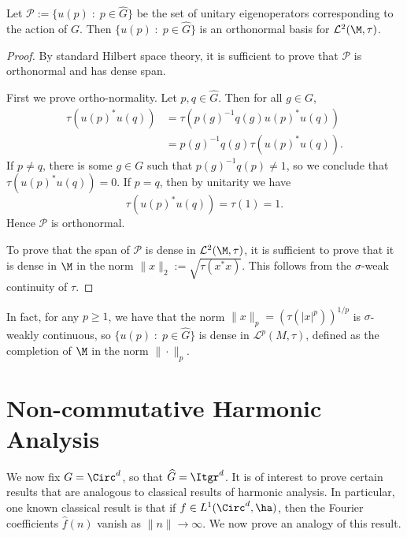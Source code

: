 \begin{proposition}
    Let $\mathcal{P} := \{u(p)\;:\;p \in \widehat{G}\}$ be the set of unitary eigenoperators
    corresponding to the action of $G$. Then $\{u(p)\;:\; p \in \widehat{G}\}$
    is an orthonormal basis for $\mathcal{L}^2(\M,\tau)$.
\end{proposition}
\begin{proof}
    By standard Hilbert space theory, it is sufficient to prove that $\mathcal{P}$
    is orthonormal and has dense span.
    
    First we prove ortho-normality. Let $p,q \in \widehat{G}$. Then for all $g \in G$,
    \begin{align}
        \tau(u(p)^*u(q)) &= \tau(p(g)^{-1}q(g)u(p)^*u(q))\\
        &= p(g)^{-1}q(g)\tau(u(p)^*u(q)).
    \end{align}
    If $p \neq q$, there is some $g \in G$ such that $p(g)^{-1}q(p) \neq 1$,
    so we conclude that $\tau(u(p)^*u(q)) = 0$.
    If $p = q$, then by unitarity we have
    \begin{equation}
        \tau(u(p)^*u(q)) = \tau(1) = 1.
    \end{equation}
    Hence $\mathcal{P}$ is orthonormal.
    
    To prove that the span of $\mathcal{P}$ is dense in $\mathcal{L}^2(\M,\tau)$,
    it is sufficient to prove that it is dense in $\M$ in the norm $\|x\|_2 := \sqrt{\tau(x^*x)}$.
    This follows from the $\sigma$-weak continuity of $\tau$.
\end{proof}

\begin{remark}
    In fact, for any $p \geq 1$, we have that the norm $\|x\|_p = (\tau(|x|^p))^{1/p}$
    is $\sigma$-weakly continuous, so $\{u(p)\;:\;p \in \widehat{G}\}$
    is dense in $\mathcal{L}^p(M,\tau)$, defined as the completion of $\M$
    in the norm $\|\cdot\|_p$. 
\end{remark}


\section{Non-commutative Harmonic Analysis}

We now fix $G = \Circ^d$, so that $\widehat{G} = \Itgr^d$. It is of interest
to prove certain results that are analogous to classical results of harmonic
analysis. In particular, one known classical result is that if $f \in L^1(\Circ^d,\ha)$,
then the Fourier coefficients $\hat{f}(n)$ vanish as $\|n\|\rightarrow \infty$. We now
prove an analogy of this result. 

